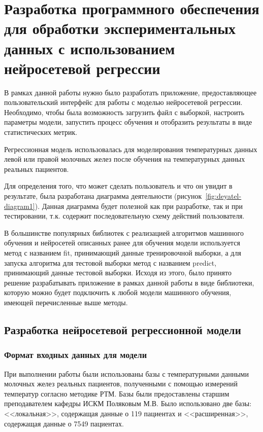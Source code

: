 \chapter{Разработка программного обеспечения для обработки экспериментальных данных с использованием нейросетевой регрессии}
В рамках данной работы нужно было разработать приложение, предоставляющее пользовательский интерфейс для работы с моделью нейросетевой регрессии. Необходимо, чтобы была возможность загрузить файл с выборкой, настроить параметры модели, запустить процесс обучения и отобразить результаты в виде статистических метрик.

Регрессионная модель использовалась для моделирования температурных данных левой или правой молочных желез после обучения на температурных данных реальных пациентов.


Для определения того, что может сделать пользователь и что он увидит в результате, была разработана диаграмма деятельности (рисунок~\ref{fig:deyatel-diagram1}). Данная диаграмма будет полезной как при разработке, так и при тестировании, т.к. содержит последовательную схему действий пользователя.




В большинстве популярных библиотек с реализацией алгоритмов машинного обучения и нейросетей описанных ранее для обучения модели используется метод с названием fit, принимающий данные тренировочной выборки, а для запуска алгоритма для тестовой выборки метод с названием predict, принимающий данные тестовой выборки. Исходя из этого, было принято решение разрабатывать приложение в рамках данной работы в виде библиотеки, которую можно будет подключить к любой модели машинного обучения, имеющей перечисленные выше методы.


\section{Разработка нейросетевой регрессионной модели}

\subsection{Формат входных данных для модели}

При выполнении работы были использованы базы с температурными данными молочных желез реальных пациентов, полученными с помощью измерений температур согласно методике РТМ. Базы были предоставлены старшим преподавателем кафедры ИСКМ Поляковым М.В. Было использовано две базы: <<локальная>>, содержащая данные о 119 пациентах и <<расширенная>>, содержащая данные о 7549 пациентах.


